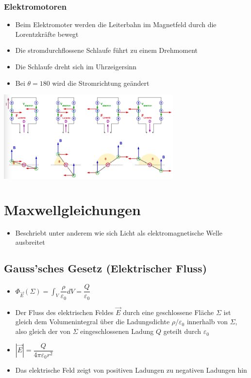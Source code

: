 \documentclass[8pt,a4paper]{scrartcl}
\begin{document}
\begin{multicols*}{3}
					\subsubsection{Elektromotoren}
						\begin{itemize}\itemsep0pt
							\item Beim Elektromoter werden die Leiterbahn im Magnetfeld durch die Lorentzkräfte bewegt
							\item Die stromdurchflossene Schlaufe führt zu einem Drehmoment
							\item Die Schlaufe dreht sich im Uhrzeigersinn
							\item Bei $\theta = 180$ wird die Stromrichtung geändert
						\end{itemize}		
						\includegraphics[height=4.6cm]{img/elemot.png} 
			\section{Maxwellgleichungen}
				\begin{itemize}\itemsep0pt
					\item Beschriebt unter anderem wie sich Licht als elektromagnetische Welle ausbreitet
				\end{itemize}				
			
			
				\subsection{Gauss’sches Gesetz (Elektrischer Fluss)}
					\begin{itemize}\itemsep0pt
						\item $\Phi_{\overrightarrow{E}}(\Sigma) = \int_{V}\dfrac{\rho}{\varepsilon_{0}}dV = \dfrac{Q}{\varepsilon_{0}}$
						\item Der Fluss des elektrischen Feldes $\overrightarrow{E}$ durch eine geschlossene Fläche $\Sigma$ ist gleich dem Volumenintegral über die Ladungsdichte $\rho / \varepsilon_{0}$ innerhalb von $\Sigma$, also gleich der von $\Sigma$ eingeschlossenen Ladung $Q$ geteilt durch $\varepsilon_{0}$
						\item $|\overrightarrow{E}| = \dfrac{Q}{4\pi\varepsilon_{0}r^{2}}$
						\item Das elektrische Feld zeigt von positiven Ladungen zu negativen Ladungen hin
					\end{itemize}		

\end{multicols*}
\end{document}
